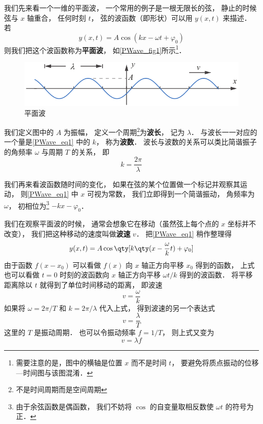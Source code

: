 

我们先来看一个一维的平面波， 一个常用的例子是一根无限长的弦， 静止的时候弦与 $x$ 轴重合， 任何时刻 $t$， 弦的波函数（即形状）可以用 $y(x, t)$ 来描述． 若
\begin{equation}\label{PWave_eq1}
y(x, t) = A\cos(k x - \omega t + \varphi_0)
\end{equation}
则我们把这个波函数称为\textbf{平面波}， 如\autoref{PWave_fig1}所示\footnote{需要注意的是，图中的横轴是位置 $x$ 而不是时间 $t$， 要避免将质点振动的位移—时间图与该图混淆．}．

\begin{figure}[ht]
\centering
\includegraphics[width=12cm]{./figures/PWave_1.pdf}
\caption{平面波} \label{PWave_fig1}
\end{figure}

我们定义图中的 $A$ 为振幅， 定义一个周期\footnote{不是时间周期而是空间周期}为\textbf{波长}， 记为 $\lambda$． 与波长一一对应的一个量是\autoref{PWave_eq1} 中的 $k$， 称为\textbf{波数}． 波长与波数的关系可以类比简谐振子 的角频率 $\omega$ 与周期 $T$ 的关系， 即
\begin{equation}
k = \frac{2\pi}{\lambda}
\end{equation}

我们再来看波函数随时间的变化， 如果在弦的某个位置做一个标记并观察其运动， 则\autoref{PWave_eq1} 中 $x$ 可视为常数， 我们立即得到一个简谐振动， 角频率为 $\omega$， 初相位为\footnote{由于余弦函数是偶函数， 我们不妨将 $\cos$ 的自变量取相反数使 $\omega t$ 的符号为正．} $-kx - \varphi_0$．

我们在观察平面波的时候， 通常会想象它在移动（虽然弦上每个点的 $x$ 坐标并不改变）， 我们把这种移动的速度叫做\textbf{波速} $v$． 把\autoref{PWave_eq1} 稍作整理得
\begin{equation}
y(x, t) = A\cos \qty[k \qty(x - \frac{\omega}{k} t) + \varphi_0]
\end{equation}
由于函数 $f(x - x_0)$ 可以看做 $f(x)$ 向 $x$ 轴正方向平移 $x_0$ 得到的函数， 上式也可以看做 $t = 0$ 时刻的波函数向 $x$ 轴正方向平移 $\omega t/k$ 得到的波函数． 将平移距离除以 $t$ 就得到了单位时间移动的距离， 即波速
\begin{equation}
v = \frac{\omega}{k}
\end{equation}
如果将 $\omega = 2\pi/T$ 和 $k = 2\pi/\lambda$ 代入上式， 得到波速的另一个表达式
\begin{equation}
v = \frac{\lambda}{T}
\end{equation}
这里的 $T$ 是振动周期． 也可以令振动频率 $f = 1/T$， 则上式又变为
\begin{equation}
v = \lambda f
\end{equation}


